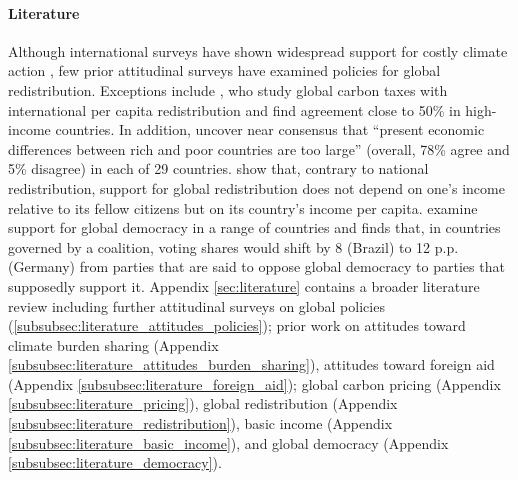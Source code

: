 

\paragraph{Literature} 
Although international surveys have shown widespread support for costly climate action \citep{dechezlepretre_fighting_2022,leiserowitz_international_2022,andre_globally_2024}, few prior attitudinal surveys have examined policies for global redistribution. Exceptions include \citet{carattini_how_2019}, who study global carbon taxes with international per capita redistribution and find agreement close to 50\% in high-income countries. %
In addition, \citet{issp_international_2019} uncover near consensus that ``present economic differences between rich and poor countries are too large'' (overall, 78\% agree and 5\% disagree) in each of 29 countries. \citet{fehr_your_2022} show that, contrary to national redistribution, support for global redistribution does not depend on one's income relative to its fellow citizens but on its country's income per capita. \citet{ghassim_public_2022} examine support for global democracy in a range of countries and finds that, in countries governed by a coalition, voting shares would shift by 8 (Brazil) to 12 p.p. (Germany) from parties that are said to oppose global democracy to parties that supposedly support it. Appendix \ref{sec:literature} contains a broader literature review including further attitudinal surveys on global policies (\ref{subsubsec:literature_attitudes_policies}); prior work on attitudes toward climate burden sharing (Appendix \ref{subsubsec:literature_attitudes_burden_sharing}), attitudes toward foreign aid (Appendix \ref{subsubsec:literature_foreign_aid}); global carbon pricing (Appendix \ref{subsubsec:literature_pricing}), global redistribution (Appendix \ref{subsubsec:literature_redistribution}), basic income (Appendix \ref{subsubsec:literature_basic_income}), and global democracy (Appendix \ref{subsubsec:literature_democracy}).

